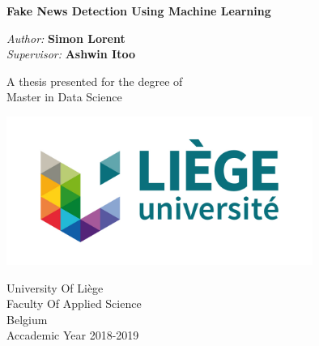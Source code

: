 \documentclass[12pt,a4paper,oneside,openany]{book}
\begin{document}
\begin{titlepage}
    \begin{center}
        \vspace*{1cm}
 
        \Huge
        \textbf{Fake News Detection Using Machine Learning }
 
        \vspace{0.5cm}
        \LARGE
        
 
        \vspace{1.5cm}
 
        \textit{Author:} \textbf{Simon Lorent}\\
        \textit{Supervisor:} \textbf{Ashwin Itoo}
 
        \vfill
 
        A thesis presented for the degree of\\
        Master in Data Science
 
        \vspace{0.8cm}
 
        \includegraphics[width=0.75\textwidth]{uliege-logo-couleurs-300}
 
        \Large
        University Of Li\`ege\\
        Faculty Of Applied Science\\
        Belgium\\
        Accademic Year 2018-2019
 
    \end{center}
\end{titlepage}

\tableofcontents












\appendix
	

\end{document}
